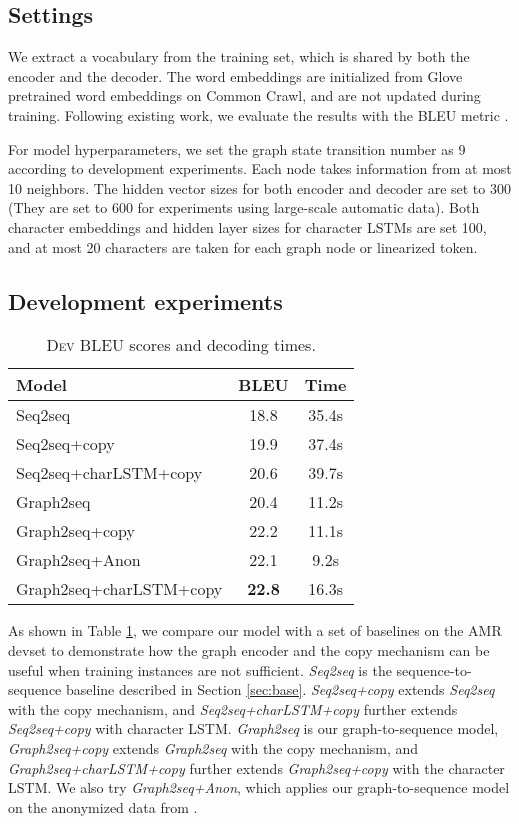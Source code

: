 \documentclass[11pt,a4paper]{article}
\begin{document}
\subsection{Settings}

We extract a vocabulary from the training set, which is shared by both the encoder and the decoder.
The word embeddings are initialized from Glove pretrained word embeddings \cite{pennington2014glove} on Common Crawl, and are not updated during training.
Following existing work, we evaluate the results with the BLEU metric \cite{papineni2002bleu}.

For model hyperparameters, we set the graph state transition number as 9 according to development experiments.
Each node takes information from at most 10 neighbors. 
The hidden vector sizes for both encoder and decoder are set to 300 (They are set to 600 for experiments using large-scale automatic data).
Both character embeddings and hidden layer sizes for character LSTMs are set 100, and at most 20 characters are taken for each graph node or linearized token.

\subsection{Development experiments}
\label{sec:comp_sys}


\begin{table}
\centering
\begin{tabular}{l|c|c}
\hline
Model & BLEU & Time \\
\hline
\hline
Seq2seq & 18.8 & 35.4s \\ Seq2seq+copy & 19.9 & 37.4s \\ Seq2seq+charLSTM+copy & 20.6 & 39.7s \\ \hline
Graph2seq & 20.4 & 11.2s \\ Graph2seq+copy & 22.2 & 11.1s \\ Graph2seq+Anon & 22.1 & 9.2s \\ Graph2seq+charLSTM+copy & \textbf{22.8} & 16.3s \\ \hline
\end{tabular}
\caption{\textsc{Dev} BLEU scores and decoding times.}
\label{tab:dev_res}
\end{table}


As shown in Table \ref{tab:dev_res}, we compare our model with a set of baselines on the AMR devset to demonstrate how the graph encoder and the copy mechanism can be useful when training instances are not sufficient.
\emph{Seq2seq} is the sequence-to-sequence baseline described in Section \ref{sec:base}.
\emph{Seq2seq+copy} extends \emph{Seq2seq} with the copy mechanism, 
and \emph{Seq2seq+charLSTM+copy} further extends \emph{Seq2seq+copy} with character LSTM\@.
\emph{Graph2seq} is our graph-to-sequence model, \emph{Graph2seq+copy} extends \emph{Graph2seq} with the copy mechanism, and \emph{Graph2seq+charLSTM+copy} further extends \emph{Graph2seq+copy} with the character LSTM\@.
We also try \emph{Graph2seq+Anon}, which applies our graph-to-sequence model on the anonymized data from .
\end{document}
